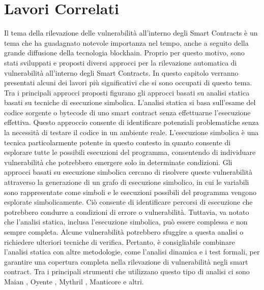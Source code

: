 \documentclass[../../Thesis.tex]{subfiles}
\begin{document}
\section{Lavori Correlati}
\label{ch:relatedwork}
Il tema della rilevazione delle vulnerabilità all'interno degli Smart Contracts è un tema che ha guadagnato notevole importanza nel tempo, anche a seguito della grande diffusione della tecnologia blockhain. Proprio per questo motivo, sono stati sviluppati e proposti diversi approcci per la rilevazione automatica di vulnerabilità all'interno degli Smart Contracts. In questo capitolo verranno presentati alcuni dei lavori più significativi che si sono occupati di questo tema.
Tra i principali approcci proposti figurano gli approcci basati su analisi statica basati su tecniche di esecuzione simbolica. L'analisi statica si basa sull'esame del codice sorgente o bytecode di uno smart contract senza effettuarne l'esecuzione effettiva. Questo approccio consente di identificare potenziali problematiche senza la necessità di testare il codice in un ambiente reale. L'esecuzione simbolica è una tecnica particolarmente potente in questo contesto in quanto consente di esplorare tutte le possibili esecuzioni del programma, consentendo di individuare vulnerabilità che potrebbero emergere solo in determinate condizioni.
Gli approcci basati su esecuzione simbolica cercano di risolvere queste vulnerabilità attraverso la generazione di un grafo di esecuzione simbolico, in cui le variabili sono rappresentate come simboli e le esecuzioni possibili del programma vengono esplorate simbolicamente. Ciò consente di identificare percorsi di esecuzione che potrebbero condurre a condizioni di errore o vulnerabilità.
Tuttavia, va notato che l'analisi statica, inclusa l'esecuzione simbolica, può essere complessa e non sempre completa. Alcune vulnerabilità potrebbero sfuggire a questa analisi o richiedere ulteriori tecniche di verifica. Pertanto, è consigliabile combinare l'analisi statica con altre metodologie, come l'analisi dinamica e i test formali, per garantire una copertura completa nella rilevazione di vulnerabilità negli smart contract. Tra i principali strumenti che utilizzano questo tipo di analisi ci sono Maian \cite{Maian, Maian2}, Oyente \cite{Oyente, Oyente2}, Mythril \cite{Mythril}, Manticore \cite{Manticore} e altri.
\end{document}
